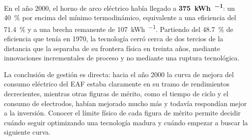 \documentclass[11pt,letterpaper]{article}
\begin{document}
En el año 2000, el horno de arco eléctrico había llegado a
\textbf{\SI{375}{\kWh\per\ton}}: un \SI{40}{\percent} por encima del mínimo
termodinámico, equivalente a una eficiencia del \SI{71.4}{\percent} y a una
brecha remanente de \SI{107}{\kWh\per\ton}. Partiendo del \SI{48.7}{\percent} de
eficiencia que tenía en 1970, la tecnología cerró cerca de dos tercios de la
distancia que la separaba de su frontera física en treinta años, mediante
innovaciones incrementales de proceso y no mediante una ruptura tecnológica.

La conclusión de gestión es directa: hacia el año 2000 la curva de mejora del
consumo eléctrico del EAF estaba claramente en su tramo de rendimientos
decrecientes, mientras otras figuras de mérito, como el tiempo de ciclo y el
consumo de electrodos, habían mejorado mucho más y todavía respondían mejor a la
inversión.
Conocer el límite físico de cada figura de mérito permite decidir cuándo seguir
optimizando una tecnología madura y cuándo empezar a buscar la siguiente curva.

\printbibliography[title={Referencias bibliográficas}]
\end{document}
